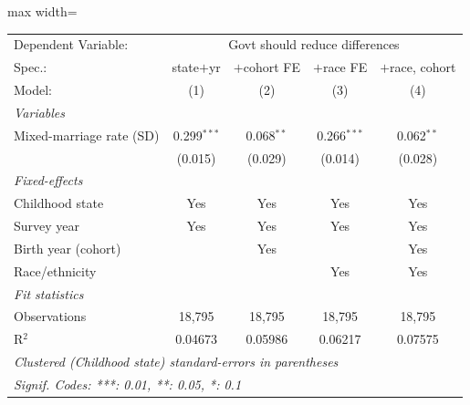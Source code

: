       \begin{adjustbox}{max width=\linewidth}
   \begin{tabular}{lcccc}
      \tabularnewline \midrule \midrule
      Dependent Variable: & \multicolumn{4}{c}{Govt should reduce differences}\\
      Spec.:                   & state$+$yr    & $+$cohort FE & $+$race FE    & $+$race, cohort \\   
      Model:                   & (1)           & (2)          & (3)           & (4)\\  
      \midrule
      \emph{Variables}\\
      Mixed-marriage rate (SD) & 0.299$^{***}$ & 0.068$^{**}$ & 0.266$^{***}$ & 0.062$^{**}$\\   
                               & (0.015)       & (0.029)      & (0.014)       & (0.028)\\   
      \midrule
      \emph{Fixed-effects}\\
      Childhood state          & Yes           & Yes          & Yes           & Yes\\  
      Survey year              & Yes           & Yes          & Yes           & Yes\\  
      Birth year (cohort)      &               & Yes          &               & Yes\\  
      Race/ethnicity           &               &              & Yes           & Yes\\  
      \midrule
      \emph{Fit statistics}\\
      Observations             & 18,795        & 18,795       & 18,795        & 18,795\\  
      R$^2$                    & 0.04673       & 0.05986      & 0.06217       & 0.07575\\  
      \midrule \midrule
      \multicolumn{5}{l}{\emph{Clustered (Childhood state) standard-errors in parentheses}}\\
      \multicolumn{5}{l}{\emph{Signif. Codes: ***: 0.01, **: 0.05, *: 0.1}}\\
   \end{tabular}
      \end{adjustbox}
\vspace{3pt}\par{}

